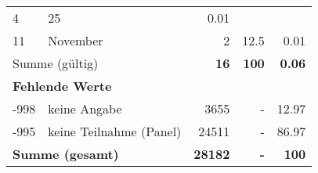 \begin{longtable}{lXrrr}
       \num{4} &
       \num[round-mode=places,round-precision=2]{25} &
         \num[round-mode=places,round-precision=2]{0,01} \\

     11 &
     \multicolumn{1}{X}{ November   } &


       \num{2} &
       \num[round-mode=places,round-precision=2]{12,5} &
         \num[round-mode=places,round-precision=2]{0,01} \\
     \midrule
     \multicolumn{2}{l}{Summe (gültig)} &
       \textbf{\num{16}} &
     \textbf{100} &
       \textbf{\num[round-mode=places,round-precision=2]{0,06}} \\
     \multicolumn{5}{l}{\textbf{Fehlende Werte}}\\
       -998 &
       keine Angabe &
         \num{3655} &
        - &
         \num[round-mode=places,round-precision=2]{12,97} \\
       -995 &
       keine Teilnahme (Panel) &
         \num{24511} &
        - &
         \num[round-mode=places,round-precision=2]{86,97} \\
     \midrule
     \multicolumn{2}{l}{\textbf{Summe (gesamt)}} &
          \textbf{\num{28182}} &
        \textbf{-} &
        \textbf{100} \\
     \bottomrule
     \end{longtable}
     
